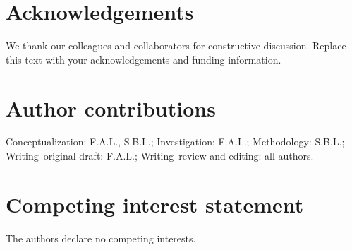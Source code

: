 \documentclass{biorxiv-chrelli}
\begin{document}



\section{Acknowledgements}
We thank our colleagues and collaborators for constructive discussion.
Replace this text with your acknowledgements and funding information.

\section{Author contributions}
Conceptualization: F.A.L., S.B.L.; Investigation: F.A.L.; Methodology: S.B.L.;
Writing--original draft: F.A.L.; Writing--review and editing: all authors.

\section{Competing interest statement}
The authors declare no competing interests.
\end{document}

